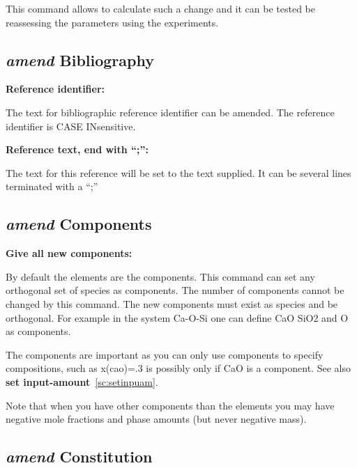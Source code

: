 \documentclass[11pt]{article}
\begin{document}
This command allows to calculate such a change and it can be tested be
reassessing the parameters using the experiments.


\hypertarget{Amend bibliography}{}

\subsection{{\em amend} Bibliography}

{\bf Reference identifier:}

The text for bibliographic reference identifier can be amended.  The
reference identifier is CASE INsensitive.

{\bf Reference text, end with ``;'':}

The text for this reference will be set to the text supplied.  It can be
several lines terminated with a ``;''

\hypertarget{Amend components}{}
\subsection{{\em amend} Components}\label{sc:amendcomp}

{\bf Give all new components:}

By default the elements are the components.  This command can set any
orthogonal set of species as components.  The number of components
cannot be changed by this command.  The new components must exist as
species and be orthogonal.  For example in the system Ca-O-Si one can
define CaO SiO2 and O as components.

The components are important as you can only use components to
specify compositions, such as x(cao)=.3 is possibly only if CaO
is a component.  See also {\bf set input-amount}~\ref{sc:setinpuam}.

Note that when you have other components than the elements you may
have negative mole fractions and phase amounts (but never negative
mass).

\hypertarget{Amend constitution}{}
\subsection{{\em amend} Constitution}

\end{document}
